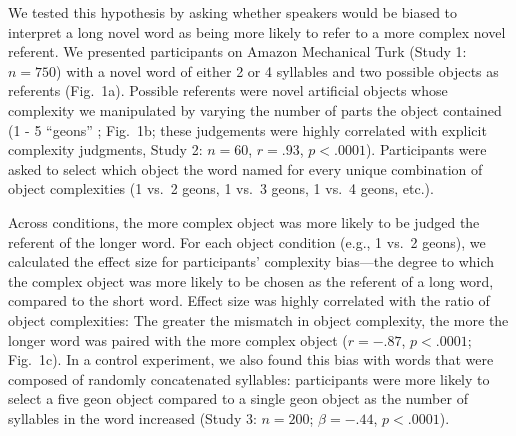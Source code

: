 \documentclass[12pt]{article}
\begin{document}
We tested this hypothesis by asking whether speakers would be biased to interpret a long novel word as being more likely to refer to a more complex novel referent. We presented participants on Amazon Mechanical Turk (Study 1: $n = 750$) with a novel word of either 2 or 4 syllables and two possible objects as referents (Fig.\ 1a). Possible referents were novel artificial objects whose complexity we manipulated by varying the number of parts the object contained (1 - 5 ``geons'' \cite{biederman1987}; Fig.\ 1b; these judgements were highly correlated with explicit complexity judgments, Study 2: $n = 60$, $r = .93$, $p < .0001$). Participants were asked to select which object the word named for every unique combination of object complexities (1 vs.\ 2 geons, 1 vs.\ 3 geons, 1 vs.\ 4 geons, etc.).

Across conditions, the more complex object was more likely to be judged the referent of the longer word. For each object condition (e.g., 1 vs.\ 2 geons), we calculated the effect size for participants' complexity bias---the degree to which the complex object was more likely to be chosen as the referent of a long word, compared to the short word.  Effect size was highly correlated with the ratio of object complexities: The greater the mismatch in object complexity, the more the longer word was paired with the more complex object ($r = -.87$, $p < .0001$; Fig.\ 1c). In a control experiment, we also found this bias with words that were composed of randomly concatenated syllables: participants were more likely to select a five geon object compared to a single geon object as the number of syllables in the word increased (Study 3: $n = 200$; $\beta=-.44$, $p <.0001$).
					
\end{document}
